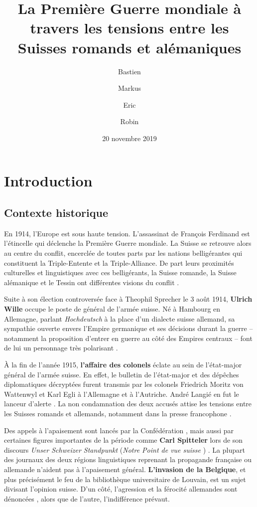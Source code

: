 \documentclass[french,a4paper]{article}
\title{La Première Guerre mondiale à travers les tensions entre les Suisses romands et alémaniques}
\author{\bsc{Beuchat} Bastien \and \bsc{Ding} Markus \and \bsc{Jollès} Eric \and \bsc{Mamie} Robin}
\date{20 novembre 2019} %
\begin{document}
\maketitle

\section*{Introduction}

\subsection*{Contexte historique}

En 1914, l'Europe est sous haute tension.
L'assassinat de François Ferdinand est l'étincelle qui déclenche la Première Guerre mondiale.
La Suisse se retrouve alors au centre du conflit, encerclée de toutes parts par les nations belligérantes qui constituent la Triple-Entente et la Triple-Alliance.
De part leurs proximités culturelles et linguistiques avec ces belligérants, la Suisse romande, la Suisse alémanique et le Tessin ont différentes visions du conflit \cite{division}.

Suite à son élection controversée face à Theophil Sprecher \cite{wahl} le 3 août 1914, \textbf{Ulrich Wille} occupe le poste de général de l'armée suisse.
Né à Hambourg en Allemagne, parlant \textit{Hochdeutsch} à la place d'un dialecte suisse allemand, sa sympathie ouverte envers l'Empire germanique et ses décisions durant la guerre -- notamment la proposition d'entrer en guerre au côté des Empires centraux \cite{krieg} -- font de lui un personnage très polarisant \cite{delire}.

À la fin de l'année 1915, \textbf{l'affaire des colonels} éclate au sein de l'état-major général de l'armée suisse.
En effet, le bulletin de l'état-major et des dépêches diplomatiques décryptées furent transmis par les colonels Friedrich Moritz von Wattenwyl et Karl Egli à l'Allemagne et à l'Autriche.
André Langié en fut le lanceur d'alerte \cite{whistle_blower}.
La non condamnation des deux accusés attise les tensions entre les Suisses romands et allemands, notamment dans la presse francophone \cite{verdict}.

Des appels à l'apaisement sont lancés par la Confédération \cite{apaisement}, mais aussi par certaines figures importantes de la période comme \textbf{Carl Spitteler} lors de son discours \og \textit{Unser Schweizer Standpunkt} \fg{} (\og \textit{Notre Point de vue suisse} \fg{}) \cite{standpunkt} \cite{rede_spitteler} .
La plupart des journaux des deux régions linguistiques reprenant la propagande française ou allemande \cite{propagande} \cite{place} n'aident pas à l'apaisement général. \textbf{L'invasion de la Belgique}, et plus précisément le feu de la bibliothèque universitaire de Louvain, est un sujet divisant l'opinion suisse.
D'un côté, l'agression et la férocité allemandes sont dénoncées \cite{massacre}, alors que de l'autre, l'indifférence prévaut.
\end{document}
